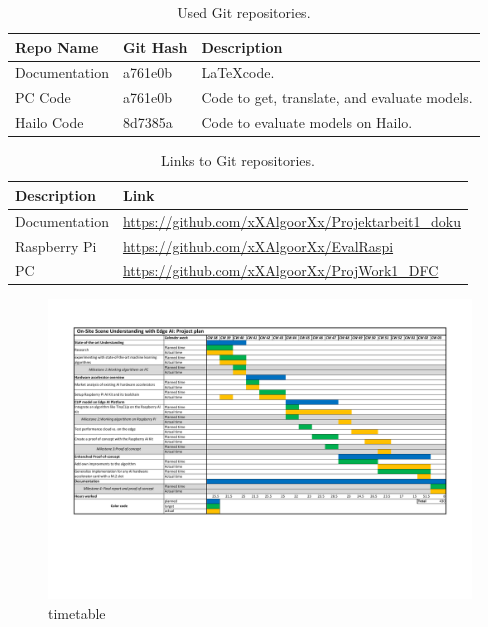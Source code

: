 \begin{table}[h!]
    \centering
    \begin{tabularx}{\textwidth}{|l|l|X|}
        \hline
        \textbf{Repo Name} & \textbf{Git Hash} & \textbf{Description}   \\ \hline
        Documentation & a761e0b & \LaTeX code. \\ \hline
        PC Code & a761e0b & Code to get, translate, and evaluate models. \\ \hline
        Hailo Code & 8d7385a & Code to evaluate models on Hailo. \\ \hline
    \end{tabularx}
    \caption{Used Git repositories.}
    \label{tab:git}
\end{table}

\begin{table}[h!]
    \centering
    \begin{tabularx}{\textwidth}{|l|X|}
        \hline
        \textbf{Description} & \textbf{Link} \\ \hline
        Documentation & \url{https://github.com/xXAlgoorXx/Projektarbeit1_doku} \\ \hline
        Raspberry Pi & \url{https://github.com/xXAlgoorXx/EvalRaspi} \\ \hline
        PC & \url{https://github.com/xXAlgoorXx/ProjWork1_DFC} \\ \hline
    \end{tabularx}
    \caption{Links to Git repositories.}
    \label{tab:gitlinks}
\end{table}


\begin{figure}
    \centering
    \includegraphics[angle = 90,height = \textheight]{Images/appendix/timetable_Lukas_cut.pdf}
    \caption{timetable}
\end{figure}